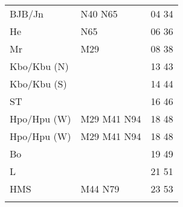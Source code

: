 \begin{tabular}{!{\color{schiefergrau}\vrule width 3pt}*{3}{l!{\color{schiefergrau}\vrule width 3pt}}}
BJB/Jn       & \nbus{} N40 N65                                            & 04 34 \\
He           & \nbus{} N65                                                & 06 36 \\
Mr           & \mbus{} M29                                                & 08 38 \\
Kbo/Kbu (N)  & \nueins{}                                                  & 13 43 \\
Kbo/Kbu (S)  & \nueins{}                                                  & 14 44 \\
ST           &                                                            & 16 46 \\
Hpo/Hpu (W)  & \nusieben{} \mbus{} M29 M41 \nbus{} N94                    & 18 48 \\
\hline
Hpo/Hpu (W)  & \nusieben{} \mbus{} M29 M41 \nbus{} N94                    & 18 48 \\
Bo           &                                                            & 19 49 \\
L            &                                                            & 21 51 \\
HMS          & \mbus{} M44 \nbus{} N79                                    & 23 53 \\
\myhline
\end{tabular}
%
